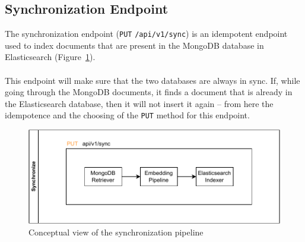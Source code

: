 \subsection{Synchronization Endpoint}\label{subsec:synchronization-endpoint-1}
The synchronization endpoint (\verb|PUT| \verb|/api/v1/sync|) is an idempotent endpoint used to index documents that are present in the MongoDB database in Elasticsearch (Figure~\ref{fig:flow-sync}). \\ \\
This endpoint will make sure that the two databases are always in sync.
If, while going through the MongoDB documents, it finds a document that is already in the Elasticsearch database, then it will not insert it again -- from here the idempotence and the choosing of the \verb|PUT| method for this endpoint.

\begin{figure}[!h]
    \begin{center}
        \includegraphics[width=0.7\linewidth]{assets/pdf/architecture/flow-sync}
    \end{center}

    \caption{Conceptual view of the synchronization pipeline}
    \label{fig:flow-sync}
\end{figure}
